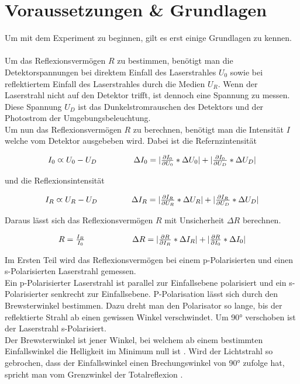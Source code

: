 \documentclass[12pt,a4paper,twoside]{article}
\begin{document}
\section{Voraussetzungen \& Grundlagen} %
Um mit dem Experiment zu beginnen, gilt es erst einige Grundlagen zu kennen. 
\\
\\
Um das Reflexionsvermögen $R$ zu bestimmen, benötigt man die Detektorspannungen bei direktem Einfall des Laserstrahles $U_0$ sowie bei reflektiertem Einfall des Laserstrahles durch die Medien $U_R$. 
Wenn der Laserstrahl nicht auf den Detektor trifft, ist dennoch eine Spannung zu messen. Diese Spannung $U_D$ ist das Dunkelstromrauschen des Detektors und der Photostrom der Umgebungsbeleuchtung. 
\\
Um nun das Reflexionsvermögen $R$ zu berechnen, benötigt man die Intensität $I$ welche vom Detektor ausgebeben wird. 
Dabei ist die Refernzintensität 

\begin{equation}
    \label{eq:Refernzintensität}
    \centerline{$I_0 \varpropto U_0 - U_D$ \\ $\Delta I_0 = \vert \frac{\partial I_0}{\partial U_0} * \Delta U_0 \vert + \vert \frac{\partial I_0}{\partial U_D} * \Delta U_D \vert$}
\end{equation}

\noindent
und die Reflexionsintensität 

\begin{equation}
    \label{eq:Reflexionsintensität}
    \centerline{$I_R \varpropto U_R - U_D$ \\ $\Delta I_R = \vert \frac{\partial I_R}{\partial U_R} * \Delta U_R \vert + \vert \frac{\partial I_R}{\partial U_D} * \Delta U_D \vert$}
\end{equation}

\noindent 
Daraus lässt sich das Reflexionsvermögen $R$ mit Unsicherheit $\Delta R$ berechnen. 

\begin{equation}
    \label{eq:Reflexionsvermögen}
    \centerline{$R=\frac{I_R}{I_0}$ \\ $\Delta R = \vert \frac{\partial R}{\partial I_R} * \Delta I_R \vert + \vert \frac{\partial R}{\partial I_0} * \Delta I_0 \vert$}
\end{equation}

\noindent
Im Ersten Teil wird das Reflexionsvermögen bei einem p-Polarisierten und einen s-Polarisierten Laserstrahl gemessen. 
\\
Ein p-Polarisierter Laserstrahl ist parallel zur Einfallsebene polarisiert und ein s-Polarisierter senkrecht zur Einfallsebene. 
P-Polarisation lässt sich durch den Brewsterwinkel bestimmen. Dazu dreht man den Polarisator so lange, bis der reflektierte Strahl ab einen gewissen Winkel verschwindet. 
Um 90° verschoben ist der Laserstrahl s-Polarisiert.
\\
Der Brewsterwinkel ist jener Winkel, bei welchem ab einem bestimmten Einfallswinkel die Helligkeit im Minimum null ist \cite{Brewster}. 
Wird der Lichtstrahl so gebrochen, dass der Einfallswinkel einen Brechungswinkel von 90° zufolge hat, spricht man vom Grenzwinkel der Totalreflexion \cite{Grenzwinkel}. 
\end{document}
